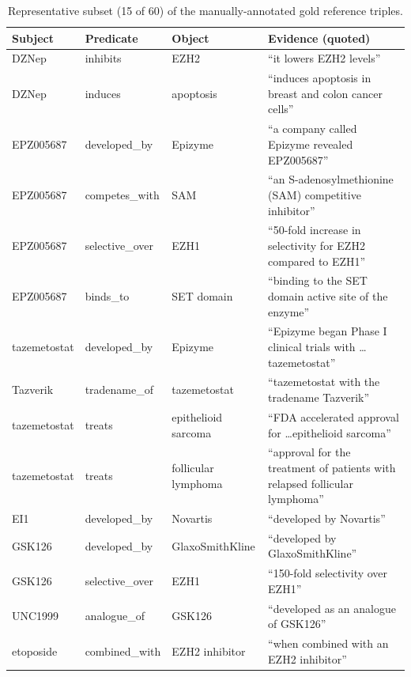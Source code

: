 \documentclass[12pt,a4paper,oneside]{report}
\begin{document}
\begin{appendices}
\begin{table}[htbp]
\centering
\caption{Representative subset (15 of 60) of the manually-annotated
gold reference triples.}
\label{tab:gold_sample}
\small
\begin{tabularx}{\textwidth}{@{}lXlX@{}}
\toprule
\textbf{Subject} & \textbf{Predicate} & \textbf{Object} & \textbf{Evidence (quoted)} \\
\midrule
DZNep         & inhibits            & EZH2                    & ``it lowers EZH2 levels'' \\
DZNep         & induces             & apoptosis               & ``induces apoptosis in breast and colon cancer cells'' \\
EPZ005687     & developed\_by       & Epizyme                 & ``a company called Epizyme revealed EPZ005687'' \\
EPZ005687     & competes\_with      & SAM                     & ``an S-adenosylmethionine (SAM) competitive inhibitor'' \\
EPZ005687     & selective\_over     & EZH1                    & ``50-fold increase in selectivity for EZH2 compared to EZH1'' \\
EPZ005687     & binds\_to           & SET domain              & ``binding to the SET domain active site of the enzyme'' \\
tazemetostat  & developed\_by       & Epizyme                 & ``Epizyme began Phase I clinical trials with \ldots tazemetostat'' \\
Tazverik      & tradename\_of       & tazemetostat            & ``tazemetostat with the tradename Tazverik'' \\
tazemetostat  & treats              & epithelioid sarcoma     & ``FDA accelerated approval for \ldots epithelioid sarcoma'' \\
tazemetostat  & treats              & follicular lymphoma     & ``approval for the treatment of patients with relapsed follicular lymphoma'' \\
EI1           & developed\_by       & Novartis                & ``developed by Novartis'' \\
GSK126        & developed\_by       & GlaxoSmithKline         & ``developed by GlaxoSmithKline'' \\
GSK126        & selective\_over     & EZH1                    & ``150-fold selectivity over EZH1'' \\
UNC1999       & analogue\_of        & GSK126                  & ``developed as an analogue of GSK126'' \\
etoposide     & combined\_with      & EZH2 inhibitor          & ``when combined with an EZH2 inhibitor'' \\
\bottomrule
\end{tabularx}
\end{table}


\end{appendices}
\end{document}
